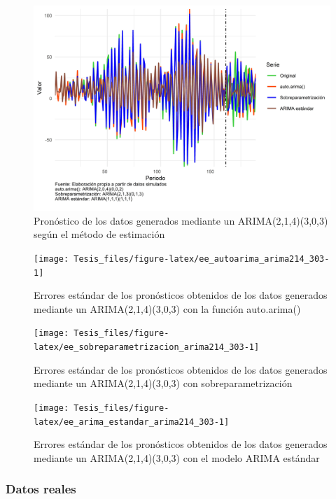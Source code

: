 \documentclass[
]{article}
\begin{document}
\begin{figure}[H]
\includegraphics[width=1\linewidth,height=1\textheight]{Tesis_files/figure-latex/pronostico_arima214_303-1} \caption{Pronóstico de los datos generados mediante un ARIMA(2,1,4)(3,0,3) según el método de estimación}\label{fig:pronostico_arima214_303}
\end{figure}

\begin{figure}[H]
\texttt{[image: Tesis\_files/figure-latex/ee\_autoarima\_arima214\_303-1]} \caption{Errores estándar de los pronósticos obtenidos de los datos generados mediante un ARIMA(2,1,4)(3,0,3) con la función auto.arima()}\label{fig:ee_autoarima_arima214_303}
\end{figure}

\begin{figure}[H]
\texttt{[image: Tesis\_files/figure-latex/ee\_sobreparametrizacion\_arima214\_303-1]} \caption{Errores estándar de los pronósticos obtenidos de los datos generados mediante un ARIMA(2,1,4)(3,0,3) con sobreparametrización}\label{fig:ee_sobreparametrizacion_arima214_303}
\end{figure}

\begin{figure}[H]
\texttt{[image: Tesis\_files/figure-latex/ee\_arima\_estandar\_arima214\_303-1]} \caption{Errores estándar de los pronósticos obtenidos de los datos generados mediante un ARIMA(2,1,4)(3,0,3) con el modelo ARIMA estándar}\label{fig:ee_arima_estandar_arima214_303}
\end{figure}

\subsubsection{Datos reales}
\end{document}
